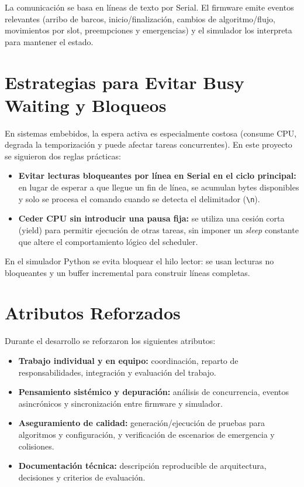 \documentclass[journal]{IEEEtran}
\begin{document}
La comunicación se basa en líneas de texto por Serial. El firmware emite eventos relevantes (arribo de barcos, inicio/finalización, cambios de algoritmo/flujo, movimientos por slot, preempciones y emergencias) y el simulador los interpreta para mantener el estado.

\section{Estrategias para Evitar Busy Waiting y Bloqueos}
En sistemas embebidos, la espera activa es especialmente costosa (consume CPU, degrada la temporización y puede afectar tareas concurrentes). En este proyecto se siguieron dos reglas prácticas:
\begin{itemize}
	\item \textbf{Evitar lecturas bloqueantes por línea en Serial en el ciclo principal:} en lugar de esperar a que llegue un fin de línea, se acumulan bytes disponibles y solo se procesa el comando cuando se detecta el delimitador (\texttt{\textbackslash n}).
	\item \textbf{Ceder CPU sin introducir una pausa fija:} se utiliza una cesión corta (yield) para permitir ejecución de otras tareas, sin imponer un \textit{sleep} constante que altere el comportamiento lógico del scheduler.
\end{itemize}
En el simulador Python se evita bloquear el hilo lector: se usan lecturas no bloqueantes y un buffer incremental para construir líneas completas.

\section{Atributos Reforzados}
Durante el desarrollo se reforzaron los siguientes atributos:
\begin{itemize}
	\item \textbf{Trabajo individual y en equipo:} coordinación, reparto de responsabilidades, integración y evaluación del trabajo.
	\item \textbf{Pensamiento sistémico y depuración:} análisis de concurrencia, eventos asincrónicos y sincronización entre firmware y simulador.
	\item \textbf{Aseguramiento de calidad:} generación/ejecución de pruebas para algoritmos y configuración, y verificación de escenarios de emergencia y colisiones.
	\item \textbf{Documentación técnica:} descripción reproducible de arquitectura, decisiones y criterios de evaluación.
\end{itemize}
\end{document}
